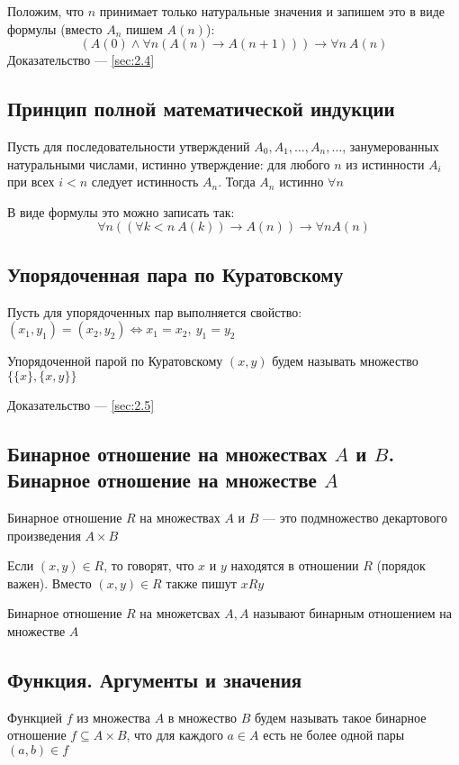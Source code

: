 \documentclass[a4paper]{article}
\begin{document}
Положим, что $n$ принимает только натуральные значения и запишем это в виде формулы (вместо $A_n$ пишем $A(n)$):
\begin{equation*}
    (A(0)\wedge\forall n(A(n)\rightarrow A(n+1)))\rightarrow\forall n\ A(n)
\end{equation*}
Доказательство — \ref{sec:2.4}

\subsection{Принцип полной математической индукции}
\label{sec:1.15} Пусть для последовательности утверждений $A_0, A_1, \ldots, A_n, \ldots$, занумерованных натуральными числами, истинно утверждение: \guillemotleft для любого $n$ из истинности $A_i$ при всех $i<n$ следует истинность $A_n$\guillemotright. Тогда $A_n$ истинно $\forall n$

В виде формулы это можно записать так:
\begin{equation*}
    \forall n((\forall k<n\ A(k))\rightarrow A(n))\rightarrow\forall nA(n)
\end{equation*}

\subsection{Упорядоченная пара по Куратовскому}
\label{sec:1.16} Пусть для упорядоченных пар выполняется свойство: $(x_1, y_1)=(x_2,y_2)\Leftrightarrow x_1=x_2,\ y_1=y_2$

 Упорядоченной парой по Куратовскому $(x,y)$ будем называть
множество $\{\{x\},\{x,y\}\}$

Доказательство — \ref{sec:2.5}

\subsection{Бинарное отношение на множествах $A$ и $B$. Бинарное отношение на множестве $A$}
 Бинарное отношение $R$ на множествах $A$ и $B$ — это подмножество декартового произведения $A\times B$

Если $(x,y)\in R$, то говорят, что $x$ и $y$ находятся в отношении $R$ (порядок важен). Вместо $(x,y)\in R$ также пишут $xRy$

 Бинарное отношение $R$ на множетсвах $A, A$ называют бинарным отношением на множестве $A$

\subsection{Функция. Аргументы и значения}
 Функцией $f$ из множества $A$ в множество $B$ будем называть такое бинарное отношение $f\subseteq A\times B$, что для каждого $a\in A$ есть не более одной пары $(a, b)\in f$
\end{document}
